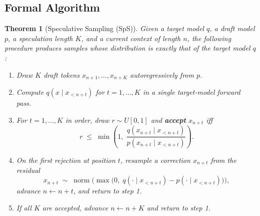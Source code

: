 \documentclass[11pt,a4paper]{article}
\theoremstyle{definition}
\theoremstyle{remark}
\theoremstyle{plain}
\newtheorem{theorem}[definition]{Theorem}
\begin{document}
\begin{center}
\end{center}

\subsection{Formal Algorithm}

\begin{theorem}[Speculative Sampling (SpS)]
Given a target model $q$, a draft model $p$, a speculation length $K$, and
a current context of length $n$, the following procedure produces samples
whose distribution is \emph{exactly} that of the target model $q$:

\begin{enumerate}[leftmargin=1.8em, itemsep=2pt]
  \item Draw $K$ draft tokens $x_{n+1}, \ldots, x_{n+K}$ autoregressively
        from $p$.
  \item Compute $q(x \mid x_{<n+t})$ for $t = 1, \ldots, K$ in a single
        target-model forward pass.
  \item For $t = 1, \ldots, K$ in order, draw $r \sim U[0,1]$ and
        \textbf{accept} $x_{n+t}$ iff
        \[
          r \;\leq\; \min\!\left(1,\; \frac{q(x_{n+t}\mid x_{<n+t})}{p(x_{n+t}\mid x_{<n+t})}\right).
        \]
  \item On the first rejection at position $t$, resample a correction
        $x_{n+t}$ from the residual
        \[
          x_{n+t} \;\sim\; \operatorname{norm}\!\bigl(\max\bigl(0,\; q(\cdot\mid x_{<n+t}) - p(\cdot\mid x_{<n+t})\bigr)\bigr),
        \]
        advance $n \gets n + t$, and return to step 1.
  \item If all $K$ are accepted, advance $n \gets n + K$ and return to
        step 1.
\end{enumerate}
\end{theorem}
\end{document}
